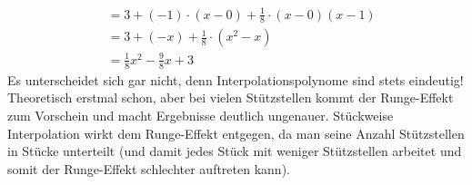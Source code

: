 {\begin{align*}
				&= 3 + (-1) \cdot (x-0) + \frac{1}{8} \cdot (x-0)(x-1) \\
				&= 3 + (-x) + \frac{1}{8} \cdot (x^2-x) \\
				&= \frac{1}{8}x^2 - \frac{9}{8}x + 3
		\end{align*}
		\itemf Es unterscheidet sich gar nicht, denn Interpolationspolynome sind stets eindeutig!
		\itemf Theoretisch erstmal schon, aber bei vielen Stützstellen kommt der Runge-Effekt zum Vorschein und macht Ergebnisse deutlich ungenauer.
		\itemf Stückweise Interpolation wirkt dem Runge-Effekt entgegen, da man seine Anzahl Stützstellen in Stücke unterteilt (und damit jedes Stück mit weniger Stützstellen arbeitet und somit der Runge-Effekt schlechter auftreten kann).
}